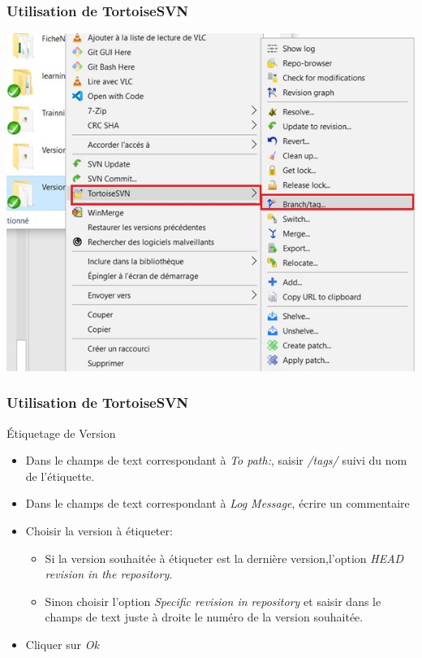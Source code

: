 \documentclass{beamer}
\begin{document}
\begin{frame}
\frametitle{Utilisation de TortoiseSVN}
\includegraphics[scale=.7]{../images/etiquetage1.jpg}
\end{frame}

\begin{frame}
\frametitle{Utilisation de TortoiseSVN}

\begin{block}{Étiquetage de Version}
\begin{itemize}
\item Dans le champs de text correspondant à \alert{\textit{To path:}}, saisir \alert{\textit{/tags/}} suivi du nom de l'étiquette.
\item Dans le champs de text correspondant à \alert{\textit{Log Message}}, écrire un commentaire
\item Choisir la version à étiqueter:
\begin{itemize}
\item Si la version souhaitée à étiqueter est la dernière version,l'option \alert{\textit{HEAD revision in the repository}}.
\item Sinon  choisir l'option \alert{\textit{Specific revision in repository}}  et saisir dans le champs de text juste à droite le numéro de la version souhaitée.
\end{itemize} 
\item Cliquer sur \alert{\textit{Ok}}
\end{itemize}
\end{block}
\end{frame}
\end{document}
